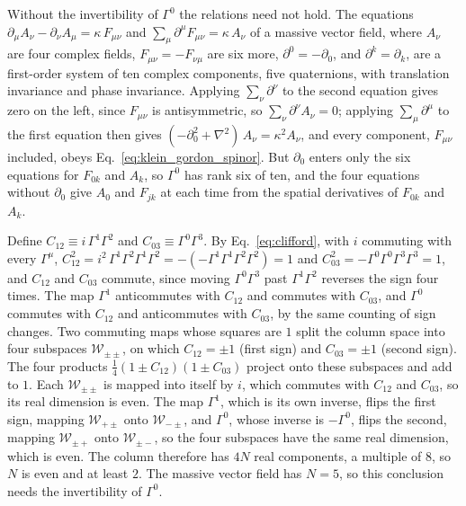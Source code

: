\documentclass[aps,prd,onecolumn,tightenlines,nofootinbib,notitlepage,11pt,floatfix]{revtex4-2}
\theoremstyle{indentedtheorem}
\begin{document}
Without the invertibility of $\Gamma^0$ the relations need not hold. The equations $\partial_\mu A_\nu-\partial_\nu A_\mu=\kappa\,F_{\mu\nu}$ and $\sum_\mu\partial^\mu F_{\mu\nu}=\kappa\,A_\nu$ of a massive vector field, where $A_\nu$ are four complex fields, $F_{\mu\nu}=-F_{\nu\mu}$ are six more, $\partial^0=-\partial_0$, and $\partial^k=\partial_k$, are a first-order system of ten complex components, five quaternions, with translation invariance and phase invariance. Applying $\sum_\nu\partial^\nu$ to the second equation gives zero on the left, since $F_{\mu\nu}$ is antisymmetric, so $\sum_\nu\partial^\nu A_\nu=0$; applying $\sum_\mu\partial^\mu$ to the first equation then gives $(-\partial_0^2+\nabla^2)\,A_\nu=\kappa^2A_\nu$, and every component, $F_{\mu\nu}$ included, obeys Eq.~\eqref{eq:klein_gordon_spinor}. But $\partial_0$ enters only the six equations for $F_{0k}$ and $A_k$, so $\Gamma^0$ has rank six of ten, and the four equations without $\partial_0$ give $A_0$ and $F_{jk}$ at each time from the spatial derivatives of $F_{0k}$ and $A_k$.

Define $C_{12}\equiv i\,\Gamma^1\Gamma^2$ and $C_{03}\equiv\Gamma^0\Gamma^3$. By Eq.~\eqref{eq:clifford}, with $i$ commuting with every $\Gamma^\mu$, $C_{12}^2=i^2\,\Gamma^1\Gamma^2\Gamma^1\Gamma^2=-(-\Gamma^1\Gamma^1\Gamma^2\Gamma^2)=1$ and $C_{03}^2=-\Gamma^0\Gamma^0\Gamma^3\Gamma^3=1$, and $C_{12}$ and $C_{03}$ commute, since moving $\Gamma^0\Gamma^3$ past $\Gamma^1\Gamma^2$ reverses the sign four times. The map $\Gamma^1$ anticommutes with $C_{12}$ and commutes with $C_{03}$, and $\Gamma^0$ commutes with $C_{12}$ and anticommutes with $C_{03}$, by the same counting of sign changes. Two commuting maps whose squares are $1$ split the column space into four subspaces $\mathcal{W}_{\pm\pm}$, on which $C_{12}=\pm1$ (first sign) and $C_{03}=\pm1$ (second sign). The four products $\tfrac{1}{4}(1\pm C_{12})(1\pm C_{03})$ project onto these subspaces and add to $1$. Each $\mathcal{W}_{\pm\pm}$ is mapped into itself by $i$, which commutes with $C_{12}$ and $C_{03}$, so its real dimension is even. The map $\Gamma^1$, which is its own inverse, flips the first sign, mapping $\mathcal{W}_{+\pm}$ onto $\mathcal{W}_{-\pm}$, and $\Gamma^0$, whose inverse is $-\Gamma^0$, flips the second, mapping $\mathcal{W}_{\pm+}$ onto $\mathcal{W}_{\pm-}$, so the four subspaces have the same real dimension, which is even. The column therefore has $4N$ real components, a multiple of $8$, so $N$ is even and at least $2$. The massive vector field has $N=5$, so this conclusion needs the invertibility of $\Gamma^0$.
\end{document}
